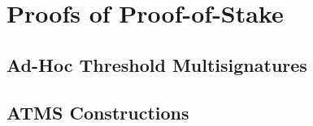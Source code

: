 \chapter{Proofs of Proof-of-Stake}

\section{Ad-Hoc Threshold Multisignatures}
\section{ATMS Constructions}
